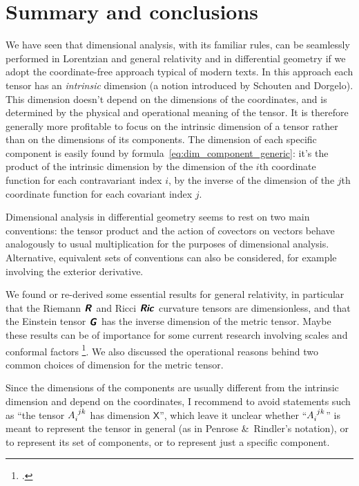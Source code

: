 \documentclass[\ifafour a4paper,12pt,\else a5paper,10pt,\fi%
onecolumn,oneside,article,%
british%
]{memoir}
\makeatletter
\theoremstyle{remark}
\theoremstyle{innote}
\newcommand*{\mathte}[1]{\textbf{\textit{\textsf{#1}}}}
\newcommand*{\citep}{\footcites}
\newcommand*{\amp}{\&}
\newcommand*{\defd}{\coloneqq}
\renewcommand*{\|}[1][]{\nonscript\,#1\vert\nonscript\;\mathopen{}}
\newcommand*{\eg}{{e.g.}}
\newcommand*{\q}{}%
\DeclareRobustCommand*{\q}{%
  \mathbin{\mathpalette\bigcdot@{}}%
}
\newcommand*{\bigcdot@scalefactor}{0.7}
\newcommand*{\bigcdot@widthfactor}{1.5}
\newcommand*{\bigcdot@}[2]{%
  \sbox0{$#1\vcenter{}$}%
  \sbox2{$#1\cdot\m@th$}%
  \hbox to \bigcdot@widthfactor\wd2{%
    \hfil
    \raise\ht0\hbox{%
      \scalebox{\bigcdot@scalefactor}{%
        \lower\ht0\hbox{$#1\bullet\m@th$}%
      }%
    }%
    \hfil
  }%
}
\newcommand*{\Un}{\textsf{1}}
\newcommand*{\Xx}{\textsf{X}}
\newcommand*{\yg}{\mathte{g}}
\newcommand*{\yG}{\mathte{G}}
\newcommand*{\yR}{\mathte{R}}
\newcommand*{\yRi}{\mathte{Ric}}
\renewcommand*{\i}{\indices}
\makeatother
\begin{document}


\section{Summary and conclusions}
\label{sec:summary}

We have seen that dimensional analysis, with its familiar rules, can be
seamlessly performed in Lorentzian and general relativity and in
differential geometry if we adopt the coordinate-free approach typical of
modern texts. In this approach each tensor has an \emph{intrinsic}
dimension (a notion introduced by Schouten and Dorgelo). This dimension
doesn't depend on the dimensions of the coordinates, and is determined by
the physical and operational meaning of the tensor. It is therefore
generally more profitable to focus on the intrinsic dimension of a tensor
rather than on the dimensions of its components. The dimension of each
specific component is easily found by
formula~\eqref{eq:dim_component_generic}: it's the product of the intrinsic
dimension by the dimension of the $i$th coordinate function for each
contravariant index $i$, by the inverse of the dimension of the $j$th
coordinate function for each covariant index $j$.

Dimensional analysis in differential geometry seems to rest on two main
conventions: the tensor product and the action of covectors on vectors
behave analogously to usual multiplication for the purposes of dimensional
analysis. Alternative, equivalent sets of conventions can also be
considered, for example involving the exterior derivative.

We found or re-derived some essential results for general relativity, in
particular that the Riemann $\yR\i{^{\q}_{\q\q\q}}$ and Ricci
$\yRi\i{_{\q\q}}$ curvature tensors are dimensionless, and that the
Einstein tensor $\yG\i{_{\q}^{\q}}$ has the inverse dimension of the metric
tensor. Maybe these results can be of importance for some current research
involving scales and conformal factors
\citep[\eg][]{roehretal2005,cadonietal2019}. We also discussed the
operational reasons behind two common choices of dimension for the metric
tensor.

Since the dimensions of the components are usually different from the
intrinsic dimension and depend on the coordinates, I recommend to avoid
statements such as \enquote{the tensor $A\i{_{i}^{jk}}$ has dimension
  $\Xx$}, which leave it unclear whether \enquote{$A\i{_{i}^{jk}}$} is
meant to represent the tensor in general (as in Penrose \amp\ Rindler's
notation), or to represent its set of components, or to represent just a
specific component.
\end{document}

